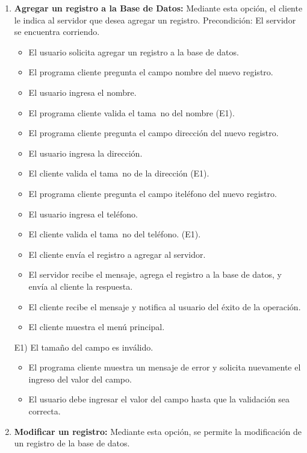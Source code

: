 \documentclass[a4paper,10pt]{article}
\begin{document}
\begin{enumerate}
                \item \textbf{Agregar un registro a la Base de Datos:} Mediante esta opci\'on, el cliente le indica al servidor que desea agregar un registro. 
                Precondici\'on: El servidor se encuentra corriendo.
                \begin{itemize}
				\item El usuario solicita agregar un registro a la base de datos. 
				\item El programa cliente pregunta el campo nombre del nuevo registro. 
				\item El usuario ingresa el nombre.
				\item El programa cliente valida el tama~no del nombre (E1).
				\item El programa cliente pregunta el campo direcci\'on del nuevo registro. 
				\item El usuario ingresa la direcci\'on.
				\item El cliente valida el tama~no de la direcci\'on (E1).
				\item El programa cliente pregunta el campo itel\'efono del nuevo registro. 
				\item El usuario ingresa el tel\'efono. 
			\item El cliente valida el tama~no del tel\'efono. (E1).
			\item El cliente env\'ia el registro a agregar al servidor.

			\item El servidor recibe el mensaje, agrega el registro a la base de datos, y env\'ia al cliente la respuesta. 
		    \item El cliente recibe el mensaje y notifica al usuario del \'exito de la operaci\'on.
			\item El cliente muestra el men\'u principal.
                \end{itemize}

                E1) El tama\~no del campo es inv\'alido. 
                \begin{itemize}
                    \item El programa cliente muestra un mensaje de error y solicita nuevamente el ingreso del valor del campo. 
			\item El usuario debe ingresar el valor del campo hasta que la validaci\'on sea correcta.
                \end{itemize}
                
                \item \textbf{Modificar un registro:} Mediante esta opci\'on, se permite la modificaci\'on de un registro de la base de datos. 
				

\end{enumerate}
\end{document}
